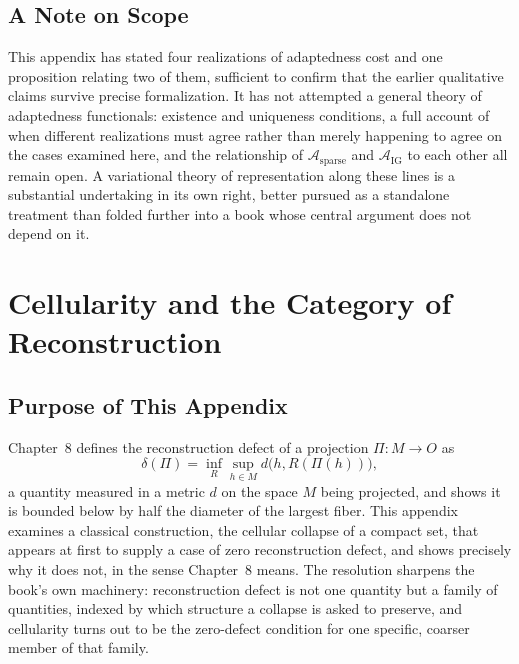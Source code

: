 \documentclass[11pt,fleqn]{book}
\numberwithin{equation}{chapter}
\theoremstyle{plain}
\theoremstyle{definition}
\theoremstyle{remark}
\begin{document}
\section{A Note on Scope}

This appendix has stated four realizations of adaptedness cost and one proposition relating two of them, sufficient to confirm that the earlier qualitative claims survive precise formalization. It has not attempted a general theory of adaptedness functionals: existence and uniqueness conditions, a full account of when different realizations must agree rather than merely happening to agree on the cases examined here, and the relationship of \(\mathcal A_{\mathrm{sparse}}\) and \(\mathcal A_{\mathrm{IG}}\) to each other all remain open. A variational theory of representation along these lines is a substantial undertaking in its own right, better pursued as a standalone treatment than folded further into a book whose central argument does not depend on it.



\chapter{Cellularity and the Category of Reconstruction}

\section{Purpose of This Appendix}

Chapter~8 defines the reconstruction defect of a projection \(\Pi:M\to O\) as
\[
\delta(\Pi) = \inf_R \sup_{h\in M} d\bigl(h, R(\Pi(h))\bigr),
\]
a quantity measured in a metric \(d\) on the space \(M\) being projected, and shows it is bounded below by half the diameter of the largest fiber. This appendix examines a classical construction, the cellular collapse of a compact set, that appears at first to supply a case of zero reconstruction defect, and shows precisely why it does not, in the sense Chapter~8 means. The resolution sharpens the book's own machinery: reconstruction defect is not one quantity but a family of quantities, indexed by which structure a collapse is asked to preserve, and cellularity turns out to be the zero-defect condition for one specific, coarser member of that family.
\end{document}
